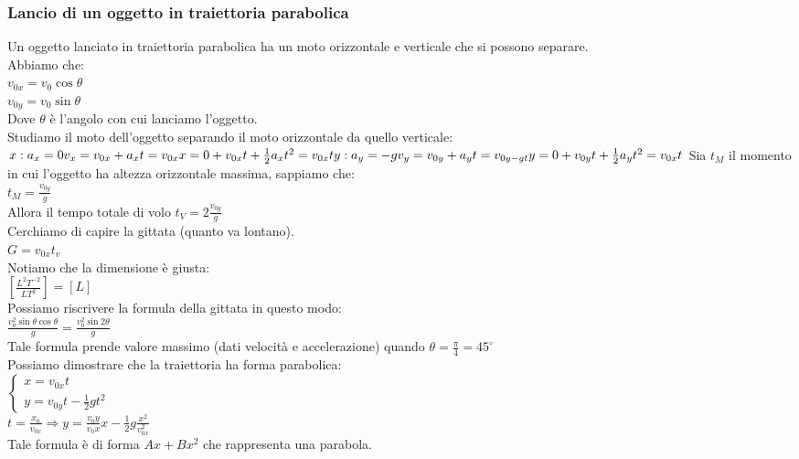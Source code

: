 \documentclass{article}
\begin{document}
\subsubsection*{Lancio di un oggetto in traiettoria parabolica}
Un oggetto lanciato in traiettoria parabolica ha un moto orizzontale e verticale
che si possono separare.\\
Abbiamo che:\\
$v_{0x}=v_0\cos\theta$\\
$v_{0y}=v_0\sin\theta$\\
Dove $\theta$ \`{e} l'angolo con cui lanciamo l'oggetto.\\
Studiamo il moto dell'oggetto separando il moto orizzontale da quello verticale:\\
$x:\\
a_x=0\\
v_x=v_{0x}+a_xt=v_{0x}\\
x=0+v_{0x}t+\frac{1}{2}a_xt^2=v_{0x}t\\
\\
y:\\
a_y=-g\\
v_y=v_{0y}+a_yt=v_{0y-gt}\\
y=0+v_{0y}t+\frac{1}{2}a_yt^2=v_{0x}t$
Sia $t_M$ il momento in cui l'oggetto ha altezza orizzontale massima, sappiamo che:\\
$t_M=\frac{v_{0y}}{g}$\\
Allora il tempo totale di volo $t_V=2\frac{v_{0y}}{g}$\\
Cerchiamo di capire la gittata (quanto va lontano).\\
$G=v_{0x}t_v$\\
Notiamo che la dimensione \`{e} giusta:\\
$[\frac{L^2T^{-2}}{LT^2}]=[L]$\\
Possiamo riscrivere la formula della gittata in questo modo:\\
$\frac{v_0^2\sin\theta\cos\theta}{g}=\frac{v_0^2\sin2\theta}{g}$\\
Tale formula prende valore massimo (dati velocit\`{a} e accelerazione) quando $\theta=\frac{\pi}{4}=45^\circ$\\
Possiamo dimostrare che la traiettoria ha forma parabolica:\\
$\begin{cases}
x=v_{0x}t\\
y=v_{0y}t-\frac{1}{2}gt^2
\end{cases}$\\
$t=\frac{x_0}{v_{0x}}\Rightarrow y=\frac{v_0y}{v_0x}x-\frac{1}{2}g\frac{x^2}{v_{0x}^2}$\\
Tale formula \`{e} di forma $Ax+Bx^2$ che rappresenta una parabola.\\
\end{document}
